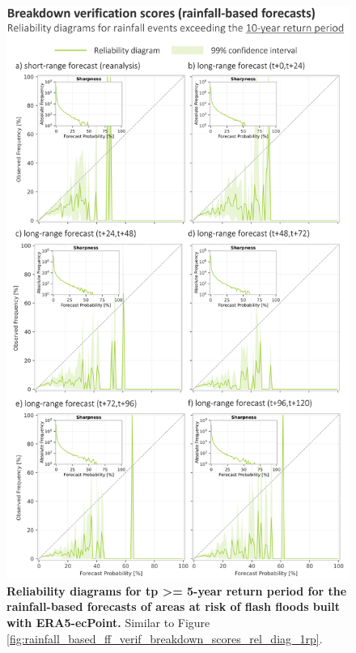 \begin{figure}[htbp]
\centering
\includegraphics[width=\textwidth]{rainfall_based_ff_verif_breakdown_scores_rel_diag_10rp.png}
\caption{\textbf{Reliability diagrams for tp >= 5-year return period for the rainfall-based forecasts of areas at risk of flash floods built with ERA5-ecPoint.} Similar to Figure \ref{fig:rainfall_based_ff_verif_breakdown_scores_rel_diag_1rp}.}
\label{fig:rainfall_based_ff_verif_breakdown_scores_rel_diag_10rp}
\end{figure}

